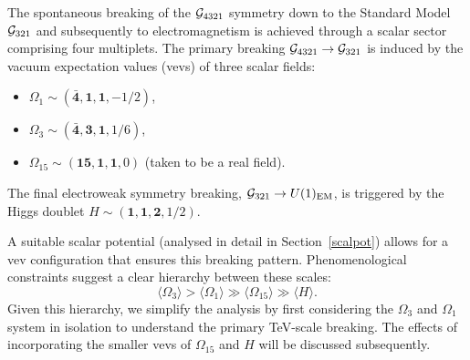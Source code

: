 The spontaneous breaking of the $\mathcal{G}_{\rm 4321}$ symmetry down to the Standard Model $\mathcal{G}_{\rm 321}$ and subsequently to electromagnetism is achieved through a scalar sector comprising four multiplets. The primary breaking $\mathcal{G}_{\rm 4321} \to \mathcal{G}_{\rm 321}$ is induced by the vacuum expectation values (vevs) of three scalar fields:
\begin{itemize}
    \item $\Omega_1 \sim \left( \mathbf{\bar 4}, \mathbf{1}, \mathbf{1}, -1/2 \right)$,
    \item $\Omega_3 \sim \left( \mathbf{\bar 4}, \mathbf{3}, \mathbf{1}, 1/6 \right)$,
    \item $\Omega_{15} \sim \left( \mathbf{15}, \mathbf{1}, \mathbf{1}, 0 \right)$ (taken to be a real field).
\end{itemize}
The final electroweak symmetry breaking, $\mathcal{G}_{\rm 321} \to U(1)_{\rm EM}$, is triggered by the Higgs doublet $H \sim (\mathbf{1},\mathbf{1},\mathbf{2},1/2)$.

A suitable scalar potential (analysed in detail in Section~\ref{scalpot}) allows for a vev configuration that ensures this breaking pattern. Phenomenological constraints suggest a clear hierarchy between these scales:
\begin{equation}
    \langle \Omega_{3} \rangle > \langle \Omega_{1} \rangle \gg \langle \Omega_{15} \rangle \gg \langle H \rangle.
\end{equation}
Given this hierarchy, we simplify the analysis by first considering the $\Omega_{3}$ and $\Omega_{1}$ system in isolation to understand the primary TeV-scale breaking. The effects of incorporating the smaller vevs of $\Omega_{15}$ and $H$ will be discussed subsequently.

